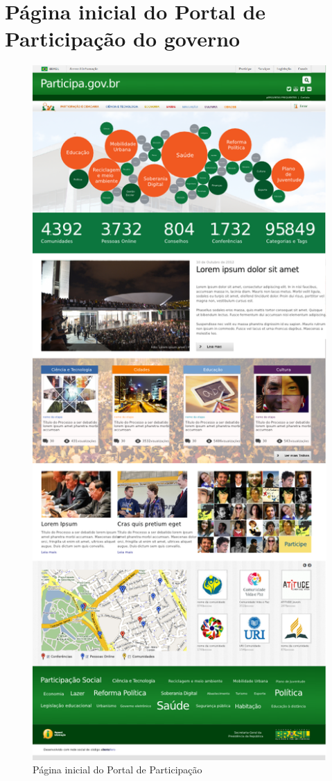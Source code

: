\section{Página inicial do Portal de Participação do governo}
\label{Att:PaginaInicial}

\begin{figure}[h]
\center
\includegraphics[scale=0.16]{pagina-inicial.png}
\caption{Página inicial do Portal de Participação}
\label{fig:pagina-inicial}
\end{figure}

